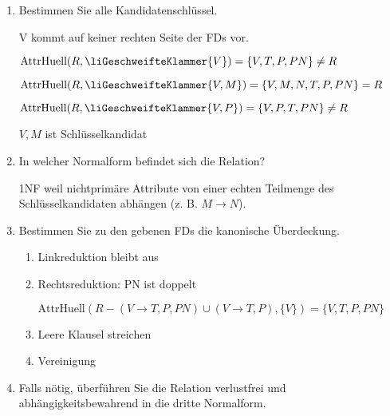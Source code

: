 \documentclass{lehramt-informatik-aufgabe}
\begin{document}
\begin{enumerate}
\item Bestimmen Sie alle Kandidatenschlüssel.

\begin{liAntwort}
V kommt auf keiner rechten Seite der FDs vor.

$\text{AttrHuell}(R, \liGeschweifteKlammer{V}) = \{V, T, P, PN\} \neq  R$

$\text{AttrHuell}(R, \liGeschweifteKlammer{V, M}) = \{V, M, N, T, P, PN\} = R$

$\text{AttrHuell}(R, \liGeschweifteKlammer{V, P}) = \{V, P, T, PN\} \neq R$

$V, M$ ist Schlüsselkandidat
\end{liAntwort}

\item In welcher Normalform befindet sich die Relation?

\begin{liAntwort}
1NF weil nichtprimäre Attribute von einer echten Teilmenge des
Schlüsselkandidaten abhängen (z. B. $M \rightarrow N$).
\end{liAntwort}

\item Bestimmen Sie zu den gebenen FDs die kanonische Überdeckung.

\begin{liAntwort}

\begin{enumerate}
\item Linkreduktion bleibt aus

\item Rechtsreduktion: PN ist doppelt

$\text{AttrHuell}(R - (V \rightarrow T, P, PN) \cup (V \rightarrow T, P), \{V\}) = \{V, T, P, PN\}$

\item Leere Klausel streichen

\item Vereinigung


\end{enumerate}

\end{liAntwort}

\item Falls nötig, überführen Sie die Relation verlustfrei und
abhängigkeitsbewahrend in die dritte Normalform.
\end{enumerate}
\end{document}
